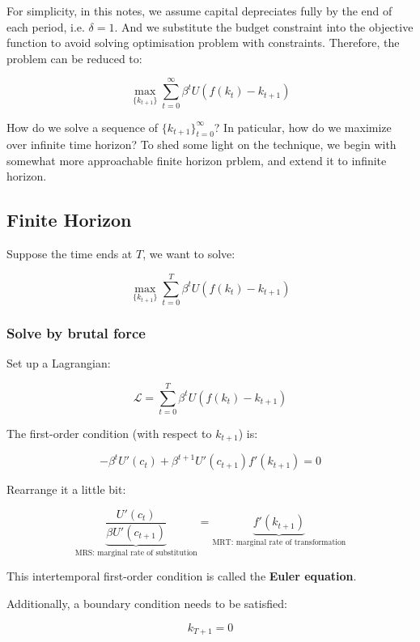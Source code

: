 \documentclass[10pt,a4]{article}
\begin{document}
For simplicity, in this notes, we assume capital depreciates fully by the end of each period, i.e. $\delta=1$. And we substitute the budget constraint into the objective function to avoid solving optimisation problem with constraints. Therefore, the problem can be reduced to:

$$ \max_{\{k_{t+1}\}} \sum_{t=0}^{\infty} \beta^t U(f(k_t) - k_{t+1}) $$



How do we solve a sequence of $\{k_{t+1}\}_{t=0}^{\infty}$? In paticular, how do we maximize over infinite time horizon? To shed some light on the technique, we begin with somewhat more approachable finite horizon prblem, and extend it to infinite horizon. 

\subsection{Finite Horizon}

{\label{609724}}\par\null

Suppose the time ends at $T$, we want to solve:

$$ \max_{\{k_{t+1}\}} \sum_{t=0}^{T} \beta^t U(f(k_t) - k_{t+1}) $$

\subsubsection{Solve by brutal force}

{\label{571029}}\par\null

Set up a Lagrangian:

$$ \mathcal{L} = \sum_{t=0}^{T} \beta^t U(f(k_t) - k_{t+1}) $$

The first-order condition (with respect to $k_{t+1}$) is:

$$ -\beta^t U'(c_t) + \beta^{t+1} U'(c_{t+1}) f'(k_{t+1}) = 0 $$

Rearrange it a little bit:

$$ \underbrace{\frac{U'(c_t)}{\beta U'(c_{t+1})}}_{\textrm{MRS: marginal rate of substitution}} = 
   \underbrace{f'(k_{t+1})}_{\textrm{MRT: marginal rate of transformation}}
$$

This intertemporal first-order condition is called the \textbf{Euler equation}.



Additionally, a boundary condition needs to be satisfied:

$$ k_{T+1} = 0 $$
\end{document}
